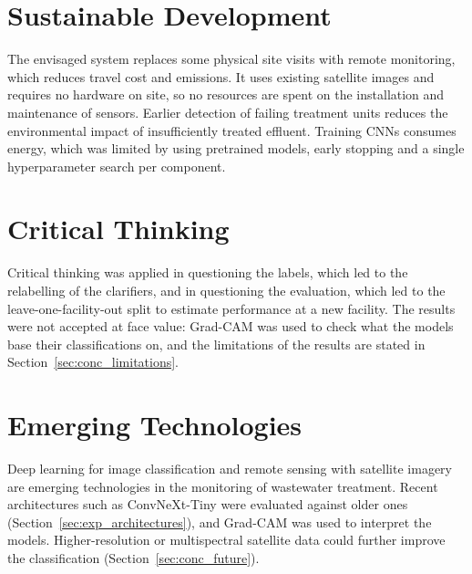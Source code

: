 \section{Sustainable Development}
The envisaged system replaces some physical site visits with remote monitoring, which reduces travel cost and emissions. It uses existing satellite images and requires no hardware on site, so no resources are spent on the installation and maintenance of sensors. Earlier detection of failing treatment units reduces the environmental impact of insufficiently treated effluent. Training CNNs consumes energy, which was limited by using pretrained models, early stopping and a single hyperparameter search per component.

\section{Critical Thinking}
Critical thinking was applied in questioning the labels, which led to the relabelling of the clarifiers, and in questioning the evaluation, which led to the leave-one-facility-out split to estimate performance at a new facility. The results were not accepted at face value: Grad-CAM was used to check what the models base their classifications on, and the limitations of the results are stated in Section~\ref{sec:conc_limitations}.

\section{Emerging Technologies}
Deep learning for image classification and remote sensing with satellite imagery are emerging technologies in the monitoring of wastewater treatment. Recent architectures such as ConvNeXt-Tiny were evaluated against older ones (Section~\ref{sec:exp_architectures}), and Grad-CAM was used to interpret the models. Higher-resolution or multispectral satellite data could further improve the classification (Section~\ref{sec:conc_future}).
